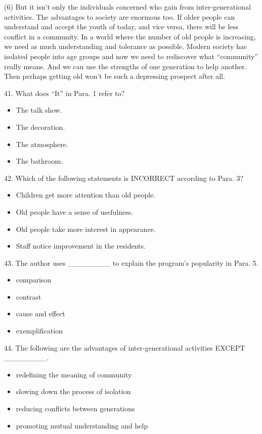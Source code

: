 \documentclass[UTF8,11pt]{ctexart}
\begin{document}
(6) But it isn’t only the individuals concerned who gain from inter-generational activities. The advantages to society are enormous too. If older people can understand and accept the youth of today, and vice versa, there will be less conflict in a community. In a world where the number of old people is increasing, we need as much understanding and tolerance as possible. Modern society has isolated people into age groups and now we need to rediscover what “community” really means. And we can use the strengths of one generation to help another. Then perhaps getting old won’t be such a depressing prospect after all.


41. What does “It” in Para. 1 refer to?


\begin{itemize}[leftmargin=2em,itemsep=.2em,topsep=.4em]\item[A.] The talk show.
\item[B.] The decoration.
\item[C.] The atmosphere.
\item[D.] The bathroom.
\end{itemize}

42. Which of the following statements is INCORRECT according to Para. 3?


\begin{itemize}[leftmargin=2em,itemsep=.2em,topsep=.4em]\item[A.] Children get more attention than old people.
\item[B.] Old people have a sense of usefulness.
\item[C.] Old people take more interest in appearance.
\item[D.] Staff notice improvement in the residents.
\end{itemize}

43. The author uses \_\_\_\_\_\_\_\_ to explain the program’s popularity in Para. 5.


\begin{itemize}[leftmargin=2em,itemsep=.2em,topsep=.4em]\item[A.] comparison
\item[B.] contrast
\item[C.] cause and effect
\item[D.] exemplification
\end{itemize}

44. The following are the advantages of inter-generational activities EXCEPT \_\_\_\_\_\_\_\_.


\begin{itemize}[leftmargin=2em,itemsep=.2em,topsep=.4em]\item[A.] redefining the meaning of community
\item[B.] slowing down the process of isolation
\item[C.] reducing conflicts between generations
\item[D.] promoting mutual understanding and help
\end{itemize}
\end{document}
